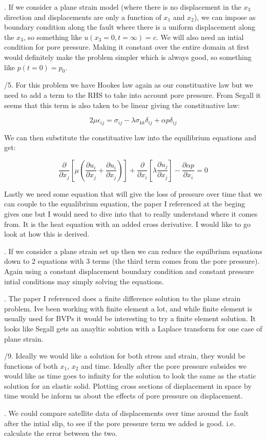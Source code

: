 \documentclass{article}
\begin{document}
. If we consider a plane strain model (where there is no displacement in the $x_3$ direction and displacements are only a function of $x_1$ and $x_2$), we can impose as boundary condition along the fault where there is a uniform displacement along the $x_3$, so something like  $u(x_3 = 0, t=\infty) = c$. We will also need an intial condition for pore pressure. Making it constant over the entire domain at first would definitely make the problem simpler which is always good, so something like  $p(t=0) = p_0$.

/5. For this problem we have Hookes law again as our constituative law but we need to add a term to the RHS to take into account pore pressure. From Segall it seems that this term is also taken to be linear giving the constituative law:

$$2\mu\epsilon_{ij} = \sigma_{ij} - \lambda\sigma_{kk}\delta_{ij} + \alpha p \delta_{ij}$$

We can then substitute the constituative law into the equilibrium equations and get:

$$\frac{\partial}{\partial x_j}\left[\mu\left(\frac{\partial u_i}{\partial x_j} + \frac{\partial u_i}{\partial x_j}\right)\right] + \frac{\partial}{\partial x_i}\left[\lambda\frac{\partial u_j}{\partial x_j}\right] - \frac{\partial \alpha p}{\partial x_i} = 0$$

Lastly we need some equation that will give the loss of pressure over time that we can couple to the equalibrium equation, the paper I referenced at the beging gives one but I would need to dive into that to really understand where it comes from. It is the heat equation with an added cross derivative. I would like to go look at how this is derived.

. If we consider a plane strain set up then we can reduce the equilbrium equations down to 2 equations with 3 terms (the third term comes from the pore pressure). Again using a constant displacement boundary condition and constant pressure intial conditions may simply solving the equations.

. The paper I referenced does a finite difference solution to the plane strain problem. Ive been working with finite element a lot, and while finite element is usually used for BVPs it would be interesting to try a finite element solution. It looks like Segall gets an anayltic solution with a Laplace transform for one case of plane strain.


/9. Ideally we would like a solution for both stress and strain, they would be functions of both $x_1$, $x_2$ and time. Ideally after the pore pressure subsides we would like as time goes to infinity for the solution to look the same as the static solution for an elastic solid. Plotting cross sections of displacement in space by time would be inform us about the effects of pore pressure on displacement.


. We could compare satellite data of displacements over time around the fault after the intial slip, to see if the pore pressure term we added is good. i.e. calculate the error between the two.
\end{document}

